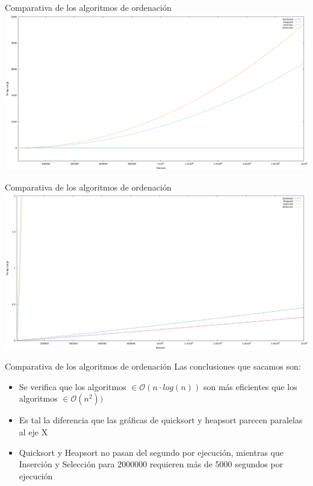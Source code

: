 \documentclass[10pt, xcolor=table]{beamer}
\begin{document}
\begin{frame}{Comparativa de los algoritmos de ordenación}
\centering
\includegraphics[scale=0.2]{../../Images/Gráfica comparativa algoritmos de ordenación Joshoccas.png}
\end{frame}

\begin{frame}{Comparativa de los algoritmos de ordenación}
	\centering
	\includegraphics[scale=0.2]{../../Images/Gráfica comparativa algoritmos ordenación Joshoccas (H y Q).png}
\end{frame}

\begin{frame}{Comparativa de los algoritmos de ordenación}
Las conclusiones que sacamos son:
\begin{itemize}
	\item Se verifica que los algoritmos \(\in \mathcal{O}(n \cdot log(n))\) son más eficientes que los algoritmos \(\in \mathcal{O}(n^2))\)
	\item Es tal la diferencia que las gráficas de quicksort y heapsort parecen paralelas al eje X
	\item Quicksort y Heapsort no pasan del segundo por ejecución, mientras que Inserción y Selección para 2000000 requieren más de 5000 segundos por ejecución
\end{itemize}
\end{frame}
\end{document}
